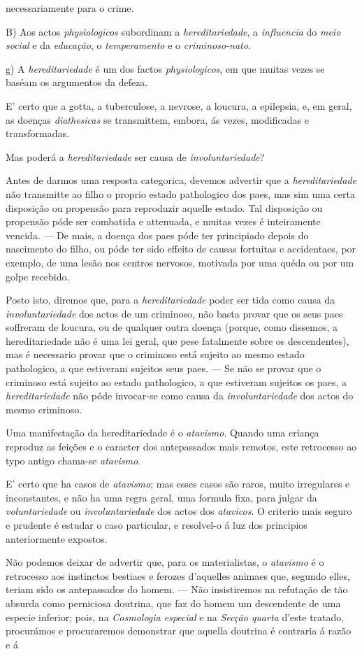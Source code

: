 necessariamente para o crime.\par *\par B) Aos actos \emph{physiologicos} subordinam a \emph{hereditariedade}, a \emph{influencia} do \emph{meio social} e da \emph{educação}, o \emph{temperamento} e o \emph{criminoso-nato}.\par g) A \emph{hereditariedade} é um dos factos \emph{physiologicos}, em que muitas vezes se baséam os argumentos da defeza.\par E' certo que a gotta, a tuberculose, a nevrose, a loucura, a epilepsia, e, em geral, as doenças \emph{diathesicas} se transmittem, embora, ás vezes, modificadas e transformadas.\par Mas poderá a \emph{hereditariedade} ser causa de \emph{involuntariedade}?\par Antes de darmos uma resposta categorica, devemos advertir que a \emph{hereditariedade} não transmitte ao filho o proprio estado pathologico dos paes, mas sim uma certa disposição ou propensão para reproduzir aquelle estado. Tal disposição ou propensão póde ser combatida e attenuada, e muitas vezes é inteiramente vencida. --- De mais, a doença dos paes póde ter principiado depois do nascimento do filho, ou póde ter sido effeito de causas fortuitas e accidentaes, por exemplo, de uma lesão nos centros nervosos, motivada por uma quéda ou por um golpe recebido.\par Posto isto, diremos que, para a \emph{hereditariedade} poder ser tida como causa da \emph{involuntariedade} dos actos de um criminoso, não basta provar que os seus paes soffreram de loucura, ou de qualquer outra doença (porque, como dissemos, a hereditariedade não é uma lei geral, que pese fatalmente sobre os descendentes), mas é necessario provar que o criminoso está sujeito ao mesmo estado pathologico, a que estiveram sujeitos seus paes. --- Se não se provar que o criminoso está sujeito ao estado pathologico, a que estiveram sujeitos os paes, a \emph{hereditariedade} não póde invocar-se como causa da \emph{involuntariedade} dos actos do mesmo criminoso.\par Uma manifestação da hereditariedade é o \emph{atavismo}. Quando uma criança reproduz as feições e o caracter dos antepassados mais remotos, este retrocesso ao typo antigo chama-se \emph{atavismo}.\par E' certo que ha casos de \emph{atavismo}; mas esses casos são raros, muito irregulares e inconstantes, e não ha uma regra geral, uma formula fixa, para julgar da \emph{voluntariedade} ou \emph{involuntariedade} dos actos dos \emph{atavicos}. O criterio mais seguro e prudente é estudar o caso particular, e resolvel-o á luz dos principios anteriormente expostos.\par Não podemos deixar de advertir que, para os materialistas, o \emph{atavismo} é o retrocesso aos instinctos bestiaes e ferozes d'aquelles animaes que, segundo elles, teriam sido os antepassados do homem. --- Não insistiremos na refutação de tão absurda como perniciosa doutrina, que faz do homem um descendente de uma especie inferior; pois, na \emph{Cosmologia especial} e na \emph{Secção quarta} d'este tratado, procurámos e procuraremos demonstrar que aquella doutrina é contraria á razão e á 